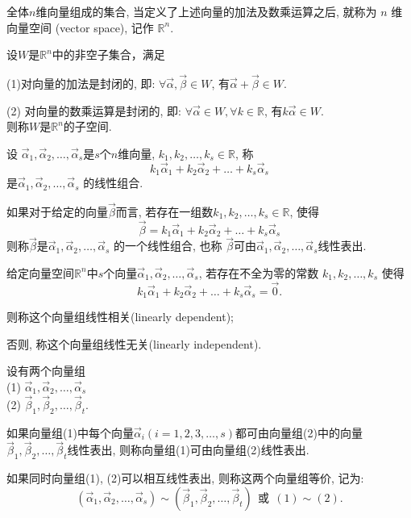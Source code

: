 \begin{Def}
全体$n$维向量组成的集合, 当定义了上述向量的加法及数乘运算之后, 就称为 $n$ 维向量空间 (vector space), 记作 $\mathbb{R}^n$.

\end{Def}

\begin{Def}
设$W$是$\mathbb{R}^n$中的非空子集合，满足

(1)对向量的加法是封闭的, 即: $\forall \vec{\alpha},\vec{\beta}\in W$, 有$\vec{\alpha}+\vec{\beta}\in W$.

(2) 对向量的数乘运算是封闭的, 即: $\forall \vec{\alpha}\in W, \forall k\in \mathbb{R}$, 有$k\vec{\alpha}\in W$.\\
则称$W$是$\mathbb{R}^n$的子空间.

\end{Def}

\begin{Def}
设 $\vec{\alpha}_1,\vec{\alpha}_2,\dots, \vec{\alpha}_s$是$s$个$n$维向量, $k_1,k_2,\dots,k_s\in\mathbb{R}$, 称$$k_1\vec{\alpha}_1+k_2\vec{\alpha}_2+\dots+k_s\vec{\alpha}_s$$是$\vec{\alpha}_1,\vec{\alpha}_2,\dots, \vec{\alpha}_s$ 的线性组合.

如果对于给定的向量$\vec{\beta}$而言, 若存在一组数$k_1,k_2,\dots,k_s\in\mathbb{R}$, 使得$$\vec{\beta}=k_1\vec{\alpha}_1+k_2\vec{\alpha}_2+\dots+k_s\vec{\alpha}_s$$
则称$\vec{\beta}$是$\vec{\alpha}_1,\vec{\alpha}_2,\dots, \vec{\alpha}_s$ 的一个线性组合, 也称 $\vec{\beta}$可由$\vec{\alpha}_1,\vec{\alpha}_2,\dots, \vec{\alpha}_s$线性表出.
\end{Def}

\begin{Def}
给定向量空间$\mathbb{R}^n$中$s$个向量$\vec{\alpha}_1,\vec{\alpha}_2,\dots, \vec{\alpha}_s$, 若存在不全为零的常数 $k_1, k_2,\dots, k_s$  使得
$$k_1\vec{\alpha}_1+k_2\vec{\alpha}_2+\dots+k_s \vec{\alpha}_s=\vec{0}.$$

则称这个向量组线性相关(linearly dependent);

否则, 称这个向量组线性无关(linearly independent).

\end{Def}

\begin{Def}
设有两个向量组 \\
(1) $\vec{\alpha}_1,\vec{\alpha}_2,\dots, \vec{\alpha}_s$\\
(2) $\vec{\beta}_1,\vec{\beta}_2,\dots,\vec{\beta}_t$.

如果向量组(1)中每个向量$\vec{\alpha}_i(i=1,2,3,\dots,s)$都可由向量组(2)中的向量$\vec{\beta}_1,\vec{\beta}_2,\dots,\vec{\beta}_t$线性表出, 则称向量组(1)可由向量组(2)线性表出.

如果同时向量组(1), (2)可以相互线性表出,  则称这两个向量组等价, 记为:
\begin{displaymath}
( \vec{\alpha}_1,\vec{\alpha}_2,\dots, \vec{\alpha}_s)\sim(\vec{\beta}_1,\vec{\beta}_2,\dots,\vec{\beta}_t)\ \ \mbox{或}\ \ (1)\sim(2).
\end{displaymath}

\end{Def}

